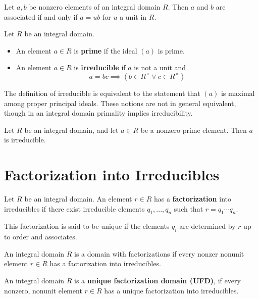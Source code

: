 \documentclass[12pt, a4paper, oneside, openright, titlepage]{book}
\begin{document}
\begin{lem}
    Let $a,b$ be nonzero elements of an integral domain $R$. Then $a$ and $b$ are associated if and only if $a = ub$ for $u$ a unit in $R$.
\end{lem}

\begin{defn}
    Let $R$ be an integral domain. \begin{itemize}
        \item An element $a \in R$ is \textbf{prime} if the ideal $(a)$ is prime.
        \item An element $a \in R$ is \textbf{irreducible} if $a$ is not a unit and $$a=bc \implies (b \in R^{\times}\lor c \in R^{\times})$$
    \end{itemize}
\end{defn}

The definition of irreducible is equivalent to the statement that $(a)$ is maximal among proper principal ideals. These notions are not in general equivalent, though in an integral domain primality implies irreducibility.

\begin{lem}
    Let $R$ be an integral domain, and let $a \in R$ be a nonzero prime element. Then $a$ is irreducible.
\end{lem}

\section{Factorization into Irreducibles}

\begin{defn}
    Let $R$ be an integral domain. An element $r \in R$ has a \textbf{factorization} into irreducibles if there exist irreducible elements $q_1,...,q_n$ such that $r = q_1\cdots q_n$.
\end{defn}
This factorization is said to be unique if the elements $q_i$ are determined by $r$ up to order and associates.

\begin{defn}
    An integral domain $R$ is a domain with factorizations if every nonzer nonunit element $r \in R$ has a factorization into irreducibles.
\end{defn}

\begin{defn}
    An integral domain $R$ is a \textbf{unique factorization domain (UFD)}, if every nonzero, nonunit element $r \in R$ has a unique factorization into irreducibles.
\end{defn}
\end{document}
